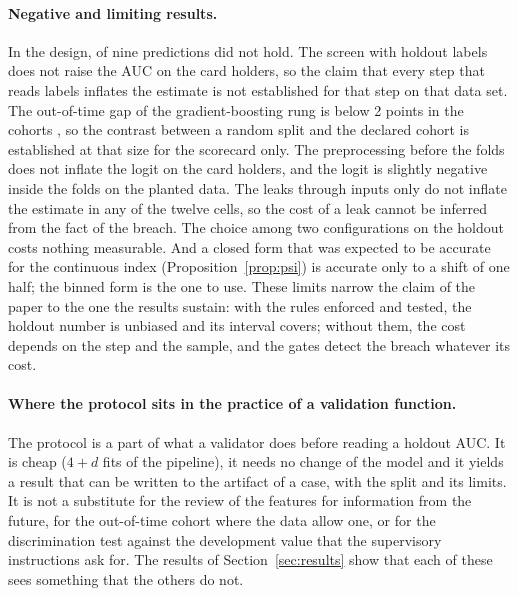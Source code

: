 \paragraph{Negative and limiting results.} In the design,  of nine predictions did not hold. The screen with holdout labels does not raise the AUC on the card holders, so the claim that every step that reads labels inflates the estimate is not established for that step on that data set. The out-of-time gap of the gradient-boosting rung is below 2 points in the cohorts , so the contrast between a random split and the declared cohort is established at that size for the scorecard only. The preprocessing before the folds does not inflate the logit on the card holders, and the logit is slightly negative inside the folds on the planted data. The leaks through inputs only do not inflate the estimate in any of the twelve cells, so the cost of a leak cannot be inferred from the fact of the breach. The choice among two configurations on the holdout costs nothing measurable. And a closed form that was expected to be accurate for the continuous index (Proposition~\ref{prop:psi}) is accurate only to a shift of one half; the binned form is the one to use. These limits narrow the claim of the paper to the one the results sustain: with the rules enforced and tested, the holdout number is unbiased and its interval covers; without them, the cost depends on the step and the sample, and the gates detect the breach whatever its cost.

\paragraph{Where the protocol sits in the practice of a validation function.} The protocol is a part of what a validator does before reading a holdout AUC. It is cheap ($4+d$ fits of the pipeline), it needs no change of the model and it yields a result that can be written to the artifact of a case, with the split and its limits. It is not a substitute for the review of the features for information from the future, for the out-of-time cohort where the data allow one, or for the discrimination test against the development value that the supervisory instructions ask for. The results of Section~\ref{sec:results} show that each of these sees something that the others do not.
